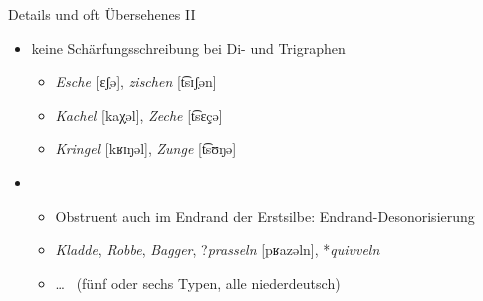 \begin{frame}
  {Details und oft Übersehenes II}
  \pause
  \begin{itemize}[<+->]
    \item \alert{keine Schärfungsschreibung bei Di- und Trigraphen}
      \begin{itemize}[<+->]
        \item \textit{Esche} [ɛʃ̣ə], \textit{zischen} [t͡sɪʃ̣ən]
        \item \textit{Kachel} [kaχ̣əl], \textit{Zeche} [t͡sɛç̣ə]
        \item \textit{Kringel} [kʁɪŋ̣əl], \textit{Zunge} [t͡sʊŋ̣ə]
      \end{itemize}
      \Halbzeile
    \item {}
      \begin{itemize}[<+->]
        \item Obstruent auch im Endrand der Erstsilbe: \alert{Endrand-Desonorisierung}
        \item \textit{Kladde}, \textit{Robbe}, \textit{Bagger}, ?\textit{prasseln} [pʁazəln], *\textit{quivveln}
        \item \ldots\  (fünf oder sechs Typen, alle niederdeutsch)
      \end{itemize}
  \end{itemize}
\end{frame}

